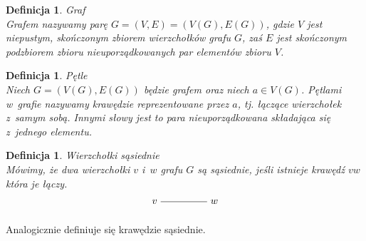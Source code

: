 \documentclass[12pt,a4paper]{report}
\newtheorem{definition}[theorem]{Definicja}
\begin{document}
\begin{definition}{Graf \cite[w oparciu o rozdział 2]{wilson2008}}\\
Grafem nazywamy parę $G=(V,E)=(V(G),E(G))$, gdzie $V$ jest niepustym, skończonym zbiorem wierzchołków grafu $G$, zaś $E$ jest skończonym podzbiorem zbioru nieuporządkowanych par elementów zbioru $V$.
\end{definition}

\begin{definition}{Pętle \cite[Rozdział 2]{wilson2008}}\\
Niech $G=(V(G), E(G))$ będzie grafem oraz niech $a \in V(G)$. Pętlami w~grafie nazywamy krawędzie reprezentowane przez $a$, tj. łączące wierzchołek z~samym sobą. Innymi słowy jest to para nieuporządkowana składająca się z~jednego elementu.
\end{definition}


\begin{definition}{Wierzchołki sąsiednie \cite[Rozdział 2]{wilson2008}}\\
Mówimy, że dwa wierzchołki $v$ i~$w$ grafu $G$ są sąsiednie, jeśli istnieje krawędź $vw$ która je łączy. 
$$
\begin{tikzpicture}[scale=.7]
  \node (v) at (-2,0) {$v$};
  \node (w) at (1,0) {$w$};
  \draw (v)--(w); 
  
\end{tikzpicture}
$$
\end{definition}
Analogicznie definiuje się krawędzie sąsiednie.
\end{document}
